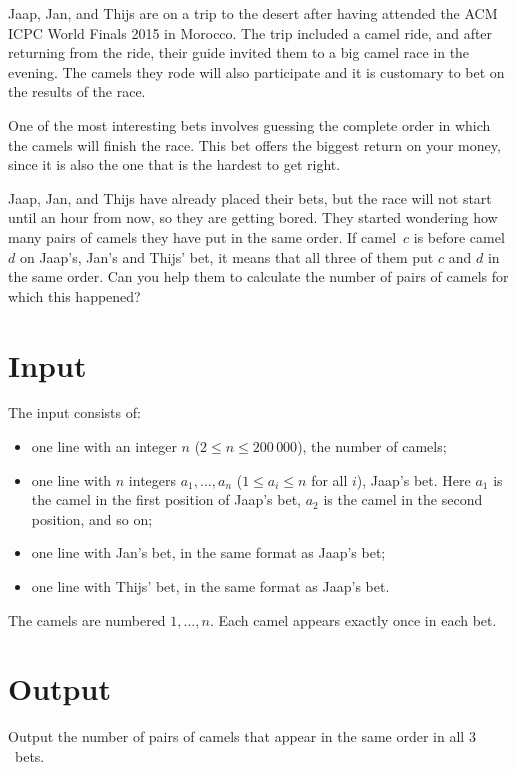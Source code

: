 
%
\noindent
Jaap, Jan, and Thijs are on a trip to the desert after having attended the ACM ICPC World Finals 2015 in Morocco.  The trip included a camel ride, and after returning from the ride, their guide invited them to a big
camel race in the evening. The camels they rode will also participate and it is
customary to bet on the results of the race.

One of the most interesting bets involves guessing the complete order in which the camels will
finish the race. This bet offers the biggest return on your money, since it is also the one that is
the hardest to get right.

Jaap, Jan, and Thijs have already placed their bets, but the race will not start until an hour from now, so they are
getting bored. They started wondering how many pairs of camels they have put in the same order. If
camel~$c$ is before camel~$d$ on Jaap's, Jan's and Thijs' bet, it means that all three of them put
$c$ and $d$ in the same order. Can you help them to calculate the number of pairs of camels for which
this happened?


\section*{Input}

The input consists of:
\begin{itemize}
\item one line with an integer $n$ ($2\leq n \leq 200\,000$), the number of
camels;
\item one line with $n$ integers $a_1, \ldots, a_n$ ($1 \le a_i \le n$ for all $i$), Jaap's bet.
  Here $a_1$ is the camel in the first position of Jaap's bet, $a_2$ is the camel in the second position, and so on;
\item one line with Jan's bet, in the same format as Jaap's bet;
\item one line with Thijs' bet, in the same format as Jaap's bet.
\end{itemize}

The camels are numbered $1, \dots, n$.  Each camel appears exactly
once in each bet.

\section*{Output}

Output the number of pairs of camels that appear in the same order in all $3$~bets.
